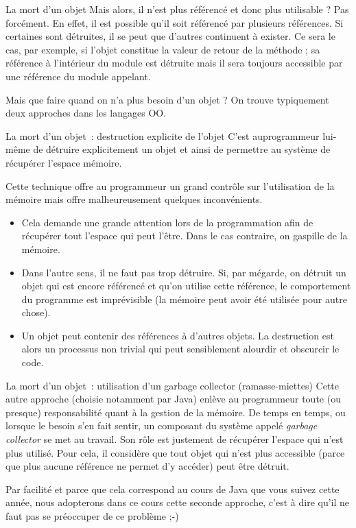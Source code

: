\begin{frame}{La mort d'un objet}
	Mais alors, il n’est plus référencé et donc plus utilisable ? Pas
	forcément. En effet, il est possible qu’il soit référencé par plusieurs
	références. Si certaines sont détruites, il se peut que d’autres
	continuent à exister. Ce sera le cas, par exemple, si l’objet constitue
	la valeur de retour de la méthode ; sa référence à l’intérieur du
	module est détruite mais il sera toujours accessible par une référence
	du module appelant.
	
	\bigskip
	
	Mais que faire quand on n’a plus besoin d’un objet ? On trouve
	typiquement deux approches dans les langages OO.
\end{frame}

\begin{frame}{La mort d'un objet~: destruction explicite de l’objet}
	C’est auprogrammeur lui-même de détruire explicitement un objet
	et ainsi de permettre au système de récupérer l’espace mémoire. 
	
	\bigskip
	
	Cette technique offre au programmeur un grand contrôle sur l’utilisation
	de la mémoire mais offre malheureusement quelques inconvénients.
	
	\bigskip

	\begin{itemize}
		\item 
			Cela demande une grande attention lors de la programmation afin de
			récupérer tout l’espace qui peut l’être. Dans le cas contraire, on
			gaspille de la mémoire.
		\item 
			Dans l’autre sens, il ne faut pas trop détruire. Si, par mégarde, on
			détruit un objet qui est encore référencé et qu'on
			utilise cette référence, le comportement du programme est imprévisible
			(la mémoire peut avoir été utilisée pour autre chose).
		\item 
			Un objet peut contenir des références à d’autres objets. La destruction
			est alors un processus non trivial qui peut sensiblement alourdir et
			obscurcir le code.
	\end{itemize}
\end{frame}

\begin{frame}{La mort d'un objet~: utilisation d’un garbage collector (ramasse-miettes)}
	Cette autre approche (choisie notamment par Java) enlève au programmeur
	toute (ou presque) responsabilité quant à la gestion de la mémoire. De
	temps en temps, ou lorsque le besoin s’en fait sentir, un composant du
	système appelé \textit{garbage collector} se met au travail. Son rôle
	est justement de récupérer l’espace qui n’est plus utilisé. Pour cela,
	il considère que tout objet qui n'est plus accessible
	(parce que plus aucune référence ne permet d’y accéder) peut être
	détruit.
	
	\bigskip
	
	Par facilité et parce que cela correspond au cours de Java que vous
	suivez cette année, nous adopterons dans ce cours cette seconde
	approche, c'est à dire qu'il ne faut
	pas se préoccuper de ce problème ;-)

\end{frame}

